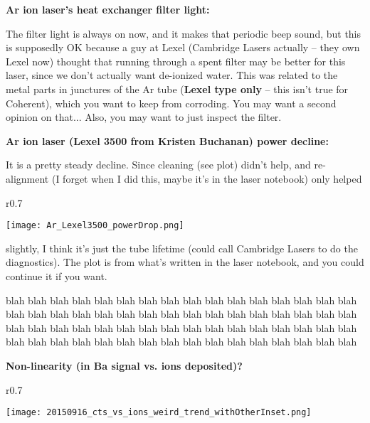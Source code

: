 \documentclass{article}
\begin{document}
\newpage

\noindent
\textbf{Ar ion laser's heat exchanger filter light:}

The filter light is always on now, and it makes that periodic beep sound, but this is supposedly OK because a guy at Lexel (Cambridge Lasers actually -- they own Lexel now) thought that running through a spent filter may be better for this laser, since we don't actually want de-ionized water.  This was related to the metal parts in junctures of the Ar tube (\textbf{Lexel type only} -- this isn't true for Coherent), which you want to keep from corroding.  You may want a second opinion on that... Also, you may want to just inspect the filter.

\vspace{5mm}

\noindent
\textbf{Ar ion laser (Lexel 3500 from Kristen Buchanan) power decline:}

It is a pretty steady decline.  Since cleaning (see plot) didn't help, and re-alignment (I forget when I did this, maybe it's in the laser notebook) only helped
\begin{wrapfigure}{r}{0.7\textwidth}
  \begin{center}
    \texttt{[image: Ar\_Lexel3500\_powerDrop.png]}
  \end{center}
\end{wrapfigure}
slightly, I think it's just the tube lifetime (could call Cambridge Lasers to do the diagnostics).  The plot is from what's written in the laser notebook, and you could continue it if you want.

{\color{white}blah blah blah blah blah blah blah blah blah blah blah blah blah blah blah blah blah blah blah blah blah blah blah blah blah blah blah blah blah blah blah blah blah blah blah blah blah blah blah blah blah blah blah blah blah blah blah blah blah blah blah blah blah blah blah blah blah blah blah blah blah blah blah blah}

\vspace{5mm}

\noindent
\textbf{Non-linearity (in Ba signal vs. ions deposited)?}

\begin{wrapfigure}{r}{0.7\textwidth}
  \begin{center}
    \texttt{[image: 20150916\_cts\_vs\_ions\_weird\_trend\_withOtherInset.png]}
  \end{center}
\end{wrapfigure}
\end{document}
